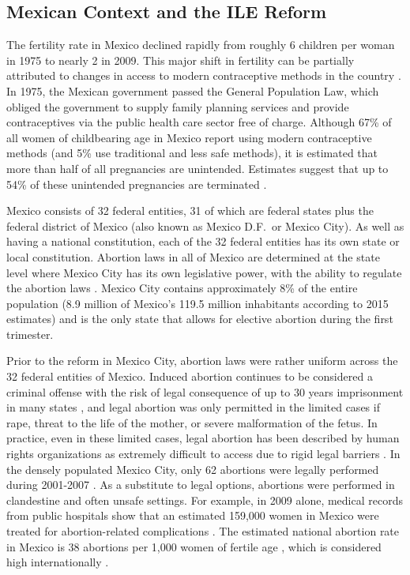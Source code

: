 \documentclass[a4paper, 11pt]{article}
\begin{document}
\begin{spacing}{2}
\section{Mexican Context and the ILE Reform}
\label{reform}
The fertility rate in Mexico declined rapidly from roughly 6 children per woman in 1975 to nearly 2 in 2009. This major shift in fertility can be partially attributed to changes in access to modern contraceptive methods in the country \citep{GIRE2009}.  In 1975, the Mexican government passed the General Population Law, which obliged the government to supply family planning services and provide contraceptives via the public health care sector free of charge. Although 67\% of all women of childbearing age in Mexico report using modern contraceptive methods (and 5\% use traditional and less safe methods), it is estimated that more than half of all pregnancies are unintended. Estimates suggest that up to 54\% of these unintended pregnancies are terminated \citep{GIRE2009}.

Mexico consists of 32 federal entities, 31 of which are federal states plus the federal district of Mexico (also known as Mexico D.F.\ or Mexico City).  As well as having a national constitution, each of the 32 federal entities has its own state or local constitution.  Abortion laws in all of Mexico are determined at the state level where Mexico City has its own legislative power, with the ability to regulate the abortion laws \citep{Becker}.  Mexico City contains approximately 8\% of the entire population (8.9 million of Mexico's 119.5 million inhabitants according to 2015 estimates) and is the only state that allows for elective abortion during the first trimester.

Prior to the reform in Mexico City, abortion laws were rather uniform across the 32 federal entities of Mexico.  Induced abortion continues to be considered a criminal offense with the risk of legal consequence of up to 30 years imprisonment in many states \citep{GIRE2009}, and legal abortion was only permitted in the limited cases if rape, threat to the life of the mother, or severe malformation of the fetus.  In practice, even in these limited cases, legal abortion has been described by human rights organizations as extremely difficult to access due to rigid legal barriers \citep{GIRE2009}. In the densely populated Mexico City, only 62 abortions were legally performed during 2001-2007 \citep{Becker}. As a substitute to legal options, abortions were performed in clandestine and often unsafe settings. For example, in 2009 alone, medical records from public hospitals show that an estimated 159,000 women in Mexico were treated for abortion-related complications \citep{GIRE2009}.  The estimated national abortion rate in Mexico is 38 abortions per 1,000 women of fertile age \citep{GIRE2009}, which is considered high internationally \citep{Becker}. 


\end{spacing}
\end{document}
